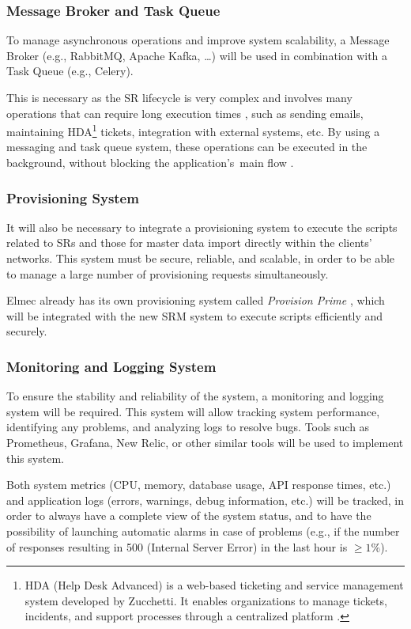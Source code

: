 \subsubsection{Message Broker and Task Queue}
To manage asynchronous operations and improve system scalability, a Message Broker (e.g., RabbitMQ, Apache Kafka, \dots) will be used in combination with a Task Queue (e.g., Celery).

This is necessary as the SR lifecycle is very complex and involves many operations that can require long execution times \cite{azioni_gestione_srp}, such as sending emails, maintaining HDA\footnote{HDA (Help Desk Advanced) is a web-based ticketing and service management system developed by Zucchetti. It enables organizations to manage tickets, incidents, and support processes through a centralized platform \cite{hda}.} tickets, integration with external systems, etc. By using a messaging and task queue system, these operations can be executed in the background, without blocking the application's~main flow \cite{queue_model_relating_sync_async_communication}.

\subsubsection{Provisioning System}
It will also be necessary to integrate a provisioning system to execute the scripts related to SRs and those for master data import directly within the clients' networks. This system must be secure, reliable, and scalable, in order to be able to manage a large number of provisioning requests simultaneously.

Elmec already has its own provisioning system called \textit{Provision Prime} \cite{provision_prime_git}, which will be integrated with the new SRM system to execute scripts efficiently and securely.

\subsubsection{Monitoring and Logging System}
To ensure the stability and reliability of the system, a monitoring and logging system will be required. This system will allow tracking system performance, identifying any problems, and analyzing logs to resolve bugs. Tools such as Prometheus, Grafana, New Relic, or other similar tools will be used to implement this system.

Both system metrics (CPU, memory, database usage, API response times, etc.) and application logs (errors, warnings, debug information, etc.) will be tracked, in order to always have a complete view of the system status, and to have the possibility of launching automatic alarms in case of problems (e.g., if the number of responses resulting in 500 (Internal Server Error) in the last hour is $\ge 1\%$).

